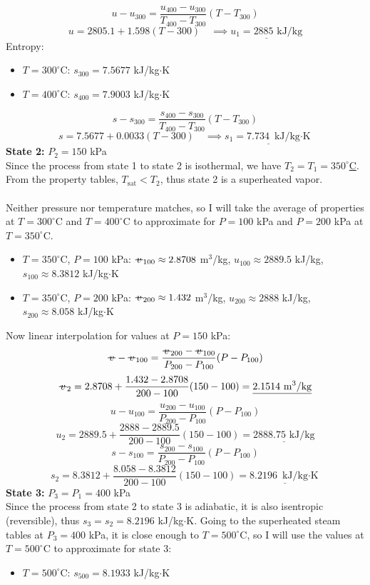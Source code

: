 \documentclass[12pt]{article}
\newcommand{\svol}{%
  \mathord{\text{\ooalign{%
    \hfil$v$\hfil\cr
    \hfil\rule[0.6ex]{0.8em}{0.5pt}\hfil
  }}}%
}
\begin{document}
\[u-u_{300} = \frac{u_{400}-u_{300}}{T_{400}-T_{300}}(T-T_{300})\]
\[u = 2805.1 + 1.598(T-300)\quad \implies \underline{u_1 = 2885 \text{ kJ/kg}} \]
Entropy:
\begin{itemize}
    \item $T=300^\circ$C: $s_{300} = 7.5677$ kJ/kg$\cdot$K
    \item $T=400^\circ$C: $s_{400} = 7.9003 $ kJ/kg$\cdot$K
\end{itemize}
\[s-s_{300} = \frac{s_{400}-s_{300}}{T_{400}-T_{300}}(T-T_{300})\]
\[s = 7.5677 + 0.0033(T-300)\quad \implies \underline{s_1 = 7.734 \text{ kJ/kg$\cdot$K}}\]
\textbf{State 2:} $P_2 = 150$ kPa\\
Since the process from state 1 to state 2 is isothermal, we have \underline{$T_2 = T_1 = 350^\circ$C}. From the property tables, $T_\text{sat}<T_2$, thus state 2 is a superheated vapor.\\\\
Neither pressure nor temperature matches, so I will take the average of properties at $T=300^\circ$C and $T=400^\circ$C to approximate for $P=100$ kPa and $P=200$ kPa at $T=350^\circ$C.
\begin{itemize}
    \item $T = 350^\circ$C, $P=100$ kPa: $\svol_{100} \approx 2.8708$ m$^3$/kg, $u_{100} \approx 2889.5$ kJ/kg, $s_{100} \approx 8.3812$ kJ/kg$\cdot$K
    \item $T = 350^\circ$C, $P=200$ kPa: $\svol_{200} \approx 1.432$ m$^3$/kg, $u_{200} \approx 2888$ kJ/kg, $s_{200} \approx 8.058$ kJ/kg$\cdot$K
\end{itemize}
Now linear interpolation for values at $P=150$ kPa:
\[\svol-\svol_{100} = \frac{\svol_{200}-\svol_{100}}{P_{200}-P_{100}}(P-P_{100})\]
\[\svol_2 = 2.8708 + \frac{1.432-2.8708}{200-100}(150-100) = \underline{2.1514 \text{ m$^3$/kg}} \]
\[u-u_{100} = \frac{u_{200}-u_{100}}{P_{200}-P_{100}}(P-P_{100})\]
\[u_2 = 2889.5 + \frac{2888-2889.5}{200-100}(150-100) = \underline{2888.75 \text{ kJ/kg}} \]
\[s-s_{100} = \frac{s_{200}-s_{100}}{P_{200}-P_{100}}(P-P_{100})\]
\[s_2 = 8.3812 + \frac{8.058-8.3812}{200-100}(150-100) = \underline{8.2196 \text{ kJ/kg$\cdot$K}} \]
\textbf{State 3:} $P_3 = P_1 = 400$ kPa\\
Since the process from state 2 to state 3 is adiabatic, it is also isentropic (reversible), thus $s_3 = s_2 = 8.2196$ kJ/kg$\cdot$K. Going to the superheated steam tables at $P_3 = 400$ kPa, it is close enough to $T=500^\circ$C, so I will use the values at $T=500^\circ$C to approximate for state 3:
\begin{itemize}
    \item $T=500^\circ$C: $s_{500} = 8.1933$ kJ/kg$\cdot$K
\end{itemize}
\end{document}
